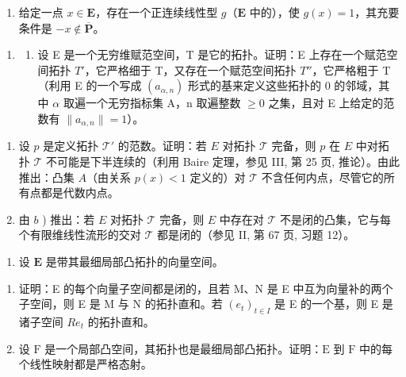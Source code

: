 \begin{enumerate}
\def\labelenumi{\alph{enumi})}
\setcounter{enumi}{1}
\tightlist
\item
  给定一点 \(x \in \mathbf{E}\)，存在一个正连续线性型 \(g\)（\(\mathbf{E}\) 中的），使 \(g(x) = 1\)，其充要条件是 \(-x \notin \overline{\mathbf{P}}\)。
\end{enumerate}

\begin{enumerate}
\def\labelenumi{\arabic{enumi})}
\setcounter{enumi}{4}
\tightlist
\item
  \begin{enumerate}
  \def\labelenumii{\alph{enumii})}
  \tightlist
  \item
    设 E 是一个无穷维赋范空间，T 是它的拓扑。证明：E 上存在一个赋范空间拓扑 \(T'\)，它严格细于 T，又存在一个赋范空间拓扑 \(T''\)，它严格粗于 T（利用 E 的一个写成 \((a_{\alpha,n})\) 形式的基来定义这些拓扑的 0 的邻域，其中 \(\alpha\) 取遍一个无穷指标集 A，n 取遍整数 \(\geqslant 0\) 之集，且对 E 上给定的范数有 \(\|a_{\alpha,n}\| = 1\)）。
  \end{enumerate}
\end{enumerate}

\begin{enumerate}
\def\labelenumi{\alph{enumi})}
\setcounter{enumi}{1}
\item
  设 \(p\) 是定义拓扑 \(\mathcal{T}'\) 的范数。证明：若 \(E\) 对拓扑 \(\mathcal{T}\) 完备，则 \(p\) 在 \(E\) 中对拓扑 \(\mathcal{T}\) 不可能是下半连续的（利用 Baire 定理，参见 III, 第 25 页, 推论）。由此推出：凸集 \(A\)（由关系 \(p(x) < 1\) 定义的）对 \(\mathcal{T}\) 不含任何内点，尽管它的所有点都是代数内点。
\item
  由 \(b\) ) 推出：若 \(E\) 对拓扑 \(\mathcal{T}\) 完备，则 \(E\) 中存在对 \(\mathcal{T}\) 不是闭的凸集，它与每个有限维线性流形的交对 \(\mathcal{T}\) 都是闭的（参见 II, 第 67 页, 习题 12）。
\end{enumerate}

\begin{enumerate}
\def\labelenumi{\arabic{enumi})}
\setcounter{enumi}{5}
\tightlist
\item
  设 \(\mathbf{E}\) 是带其最细局部凸拓扑的向量空间。
\end{enumerate}

\begin{enumerate}
\def\labelenumi{\alph{enumi})}
\item
  证明：E 的每个向量子空间都是闭的，且若 M、N 是 E 中互为向量补的两个子空间，则 E 是 M 与 N 的拓扑直和。若 \((e_{t})_{t\in I}\) 是 E 的一个基，则 E 是诸子空间 \(Re_{t}\) 的拓扑直和。
\item
  设 \(\mathrm{F}\) 是一个局部凸空间，其拓扑也是最细局部凸拓扑。证明：\(\mathrm{E}\) 到 \(\mathrm{F}\) 中的每个线性映射都是严格态射。
\end{enumerate}

